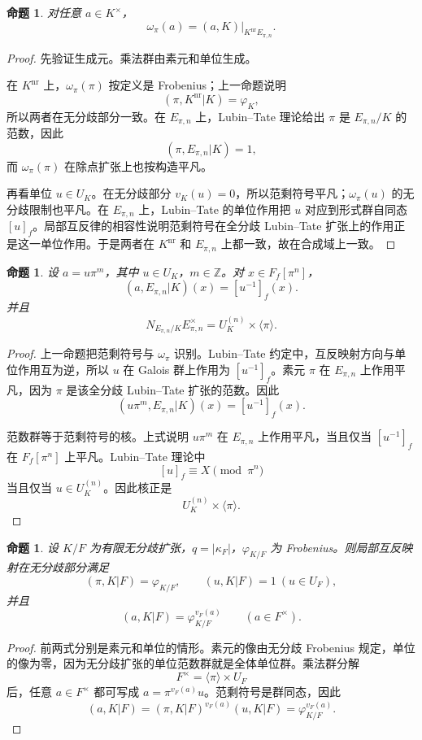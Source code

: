 \documentclass[11pt,a4paper,openany]{ctexbook}
\numberwithin{equation}{chapter}
\newcommand{\Z}{\mathbb{Z}}
\theoremstyle{plain}
\newtheorem{proposition}[theorem]{命题}
\theoremstyle{definition}
\theoremstyle{remark}
\begin{document}
\begin{proposition}
对任意 $a\in K^\times$，
\[
\omega_\pi(a)=(a,K)|_{K^{\mathrm{nr}}E_{\pi,n}}.
\]
\end{proposition}

\begin{proof}
先验证生成元。乘法群由素元和单位生成。

在 $K^{\mathrm{nr}}$ 上，$\omega_\pi(\pi)$ 按定义是 Frobenius；上一命题说明
\[
(\pi,K^{\mathrm{nr}}|K)=\varphi_K,
\]
所以两者在无分歧部分一致。在 $E_{\pi,n}$ 上，Lubin--Tate 理论给出 $\pi$ 是 $E_{\pi,n}/K$ 的范数，因此
\[
(\pi,E_{\pi,n}|K)=1,
\]
而 $\omega_\pi(\pi)$ 在除点扩张上也按构造平凡。

再看单位 $u\in U_K$。在无分歧部分 $v_K(u)=0$，所以范剩符号平凡；$\omega_\pi(u)$ 的无分歧限制也平凡。在 $E_{\pi,n}$ 上，Lubin--Tate 的单位作用把 $u$ 对应到形式群自同态 $[u]_f$。局部互反律的相容性说明范剩符号在全分歧 Lubin--Tate 扩张上的作用正是这一单位作用。于是两者在 $K^{\mathrm{nr}}$ 和 $E_{\pi,n}$ 上都一致，故在合成域上一致。
\end{proof}

\begin{proposition}
设 $a=u\pi^m$，其中 $u\in U_K$，$m\in\Z$。对 $x\in F_f[\pi^n]$，
\[
(a,E_{\pi,n}|K)(x)=[u^{-1}]_f(x).
\]
并且
\[
N_{E_{\pi,n}/K}E_{\pi,n}^\times=U_K^{(n)}\times\langle\pi\rangle.
\]
\end{proposition}

\begin{proof}
上一命题把范剩符号与 $\omega_\pi$ 识别。Lubin--Tate 约定中，互反映射方向与单位作用互为逆，所以 $u$ 在 Galois 群上作用为 $[u^{-1}]_f$。素元 $\pi$ 在 $E_{\pi,n}$ 上作用平凡，因为 $\pi$ 是该全分歧 Lubin--Tate 扩张的范数。因此
\[
(u\pi^m,E_{\pi,n}|K)(x)=[u^{-1}]_f(x).
\]

范数群等于范剩符号的核。上式说明 $u\pi^m$ 在 $E_{\pi,n}$ 上作用平凡，当且仅当 $[u^{-1}]_f$ 在 $F_f[\pi^n]$ 上平凡。Lubin--Tate 理论中
\[
[u]_f\equiv X\pmod{\pi^n}
\]
当且仅当 $u\in U_K^{(n)}$。因此核正是
\[
U_K^{(n)}\times\langle\pi\rangle.
\]
\end{proof}

\begin{proposition}
设 $K/F$ 为有限无分歧扩张，$q=|\kappa_F|$，$\varphi_{K/F}$ 为 Frobenius。则局部互反映射在无分歧部分满足
\[
(\pi,K|F)=\varphi_{K/F},\qquad (u,K|F)=1\ (u\in U_F),
\]
并且
\[
(a,K|F)=\varphi_{K/F}^{v_F(a)}\qquad(a\in F^\times).
\]
\end{proposition}

\begin{proof}
前两式分别是素元和单位的情形。素元的像由无分歧 Frobenius 规定，单位的像为零，因为无分歧扩张的单位范数群就是全体单位群。乘法群分解
\[
F^\times=\langle\pi\rangle\times U_F
\]
后，任意 $a\in F^\times$ 都可写成 $a=\pi^{v_F(a)}u$。范剩符号是群同态，因此
\[
(a,K|F)=(\pi,K|F)^{v_F(a)}(u,K|F)=\varphi_{K/F}^{v_F(a)}.
\]
\end{proof}
\end{document}
